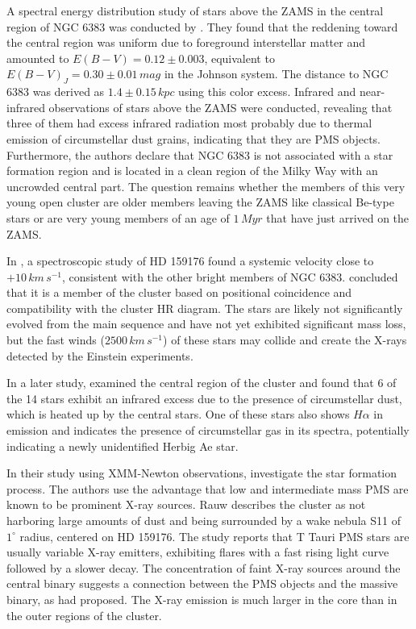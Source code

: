 \documentclass[fleqn,usenatbib,usedcolumn,useAMS]{mnras}
\newcommand{\kms}{\,km\,s^{-1}} %
\begin{document}
A spectral energy distribution study of stars above the ZAMS in the central region of NGC 6383 was conducted by \citet{1985A&A...151..391T}. They found that the reddening toward the central region was uniform due to foreground interstellar matter and amounted to $E(B-V) = 0.12 \pm 0.003$, equivalent to $E(B-V)_J = 0.30 \pm 0.01\,mag$ in the Johnson system. The distance to NGC 6383 was derived as $1.4 \pm 0.15 \, kpc$ using this color excess. Infrared and near-infrared observations of stars above the ZAMS were conducted, revealing that three of them had excess infrared radiation most probably due to thermal emission of circumstellar dust grains, indicating that they are PMS objects. Furthermore, the authors declare that NGC 6383 is not associated with a star formation region and is located in a clean region of the Milky Way with an uncrowded central part. The question remains whether the members of this very young open cluster are older members leaving the ZAMS like classical Be-type stars or are very young members of an age of $1\,Myr$ that have just arrived on the ZAMS.

In \citet{1993Obs...113..204S}, a spectroscopic study of HD 159176 found a systemic velocity close to $+10 \kms$, consistent with the other bright members of NGC 6383. \citet{1978MNRAS.184..661L} concluded that it is a member of the cluster based on positional coincidence and compatibility with the cluster HR diagram. The stars are likely not significantly evolved from the main sequence and have not yet exhibited significant mass loss, but the fast winds ($2500 \kms$) of these stars may collide and create the X-rays detected by the Einstein experiments.

In a later study, \citet{2000A&A...362..580V} examined the central region of the cluster and found that 6 of the 14 stars exhibit an infrared excess due to the presence of circumstellar dust, which is heated up by the central stars. One of these stars also shows $H\alpha$ in emission and indicates the presence of circumstellar gas in its spectra, potentially indicating a newly unidentified Herbig Ae star.

In their study using XMM-Newton observations, \citet{2003A&A...407..925R} investigate the star formation process. The authors use the advantage that low and intermediate mass PMS are known to be prominent X-ray sources. Rauw describes the cluster as not harboring large amounts of dust and being surrounded by a wake nebula S11 of $1^\circ$ radius, centered on HD 159176. The study reports that T Tauri PMS stars are usually variable X-ray emitters, exhibiting flares with a fast rising light curve followed by a slower decay. The concentration of faint X-ray sources around the central binary suggests a connection between the PMS objects and the massive binary, as \citet{1978MNRAS.182..607F} had proposed. The X-ray emission is much larger in the core than in the outer regions of the cluster. 
\end{document}
